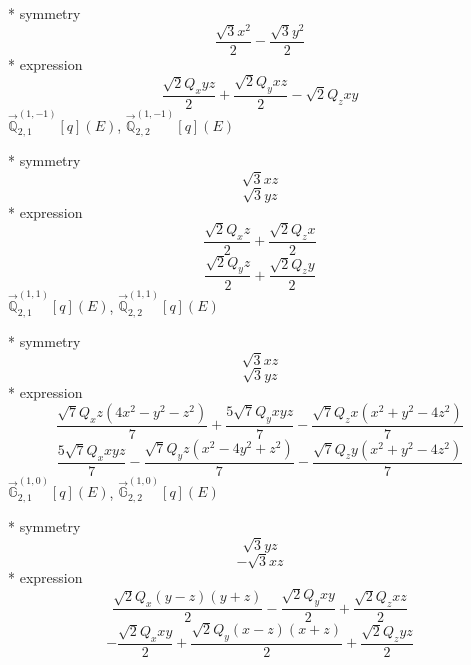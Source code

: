 \documentclass[fleqn,8pt]{jsarticle}
\begin{document}
\noindent\quad ** symmetry
\begin{dmath*}
\frac{\sqrt{3} x^{2}}{2} - \frac{\sqrt{3} y^{2}}{2}
\end{dmath*}
\noindent\quad ** expression
\begin{dmath*}
\frac{\sqrt{2} Q_{x} y z}{2} + \frac{\sqrt{2} Q_{y} x z}{2} - \sqrt{2} Q_{z} x y
\end{dmath*}
\noindent\quad $\vec{\mathbb{Q}}_{2,1}^{(1,-1)}[q](E)$, $\vec{\mathbb{Q}}_{2,2}^{(1,-1)}[q](E)$

\noindent\quad ** symmetry
\begin{dmath*}
\sqrt{3} x z
\end{dmath*}
\begin{dmath*}
\sqrt{3} y z
\end{dmath*}
\noindent\quad ** expression
\begin{dmath*}
\frac{\sqrt{2} Q_{x} z}{2} + \frac{\sqrt{2} Q_{z} x}{2}
\end{dmath*}
\begin{dmath*}
\frac{\sqrt{2} Q_{y} z}{2} + \frac{\sqrt{2} Q_{z} y}{2}
\end{dmath*}
\noindent\quad $\vec{\mathbb{Q}}_{2,1}^{(1,1)}[q](E)$, $\vec{\mathbb{Q}}_{2,2}^{(1,1)}[q](E)$

\noindent\quad ** symmetry
\begin{dmath*}
\sqrt{3} x z
\end{dmath*}
\begin{dmath*}
\sqrt{3} y z
\end{dmath*}
\noindent\quad ** expression
\begin{dmath*}
\frac{\sqrt{7} Q_{x} z \left(4 x^{2} - y^{2} - z^{2}\right)}{7} + \frac{5 \sqrt{7} Q_{y} x y z}{7} - \frac{\sqrt{7} Q_{z} x \left(x^{2} + y^{2} - 4 z^{2}\right)}{7}
\end{dmath*}
\begin{dmath*}
\frac{5 \sqrt{7} Q_{x} x y z}{7} - \frac{\sqrt{7} Q_{y} z \left(x^{2} - 4 y^{2} + z^{2}\right)}{7} - \frac{\sqrt{7} Q_{z} y \left(x^{2} + y^{2} - 4 z^{2}\right)}{7}
\end{dmath*}
\noindent\quad $\vec{\mathbb{G}}_{2,1}^{(1,0)}[q](E)$, $\vec{\mathbb{G}}_{2,2}^{(1,0)}[q](E)$

\noindent\quad ** symmetry
\begin{dmath*}
\sqrt{3} y z
\end{dmath*}
\begin{dmath*}
- \sqrt{3} x z
\end{dmath*}
\noindent\quad ** expression
\begin{dmath*}
\frac{\sqrt{2} Q_{x} \left(y - z\right) \left(y + z\right)}{2} - \frac{\sqrt{2} Q_{y} x y}{2} + \frac{\sqrt{2} Q_{z} x z}{2}
\end{dmath*}
\begin{dmath*}
- \frac{\sqrt{2} Q_{x} x y}{2} + \frac{\sqrt{2} Q_{y} \left(x - z\right) \left(x + z\right)}{2} + \frac{\sqrt{2} Q_{z} y z}{2}
\end{dmath*}
\end{document}
